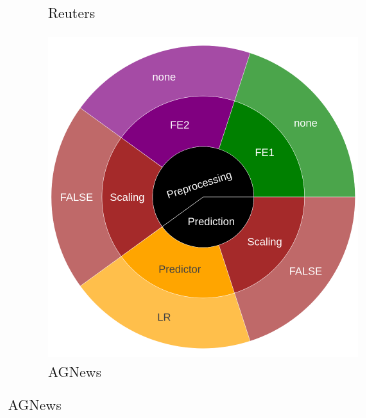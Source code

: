 \begin{figure}
\begin{subfigure}[t]{0.3\textwidth}
    \caption{Reuters}
  	\end{subfigure}
	\begin{subfigure}[t]{0.3\textwidth}
    \centering\includegraphics[width=0.9\textwidth]{img/sunburst/agnews.png}
    \caption{AGNews}
  	\end{subfigure}


\end{figure}
